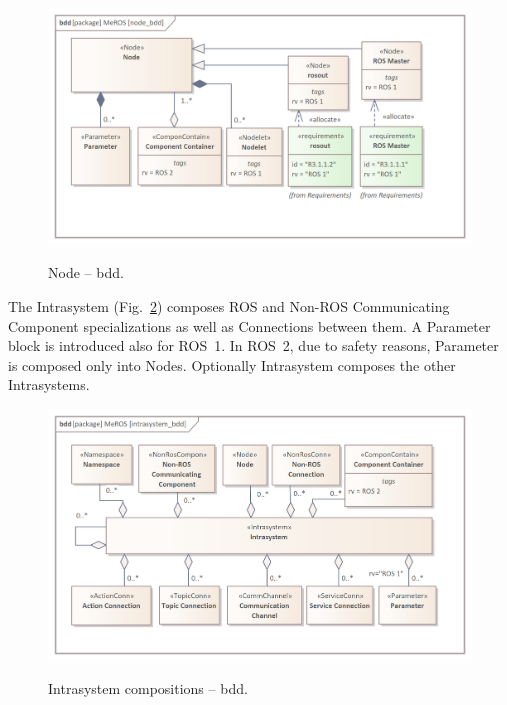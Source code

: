 \begin{figure}[H]
    \centering
    \begin{center}
    {\includegraphics[scale=1.0]{../imgs/meros_pkg/node_bdd.png}}
    \end{center}
    \caption{Node -- bdd.}
    \label{fig:node_bdd}
\end{figure}

The Intrasystem (Fig.~\ref{fig:intrasystem_bdd}) composes ROS and Non-ROS Communicating Component specializations as well as Connections between them. A Parameter block is introduced also for ROS~1. In ROS~2, due to safety reasons, Parameter is composed only into Nodes. Optionally Intrasystem composes the other Intrasystems.


\begin{figure}[H]
    \centering
    \begin{center}
    {\includegraphics[scale=1.0]{../imgs/meros_pkg/intrasystem_bdd.png}}
    \end{center}
    \caption{Intrasystem compositions -- bdd.}
    \label{fig:intrasystem_bdd}
\end{figure}


